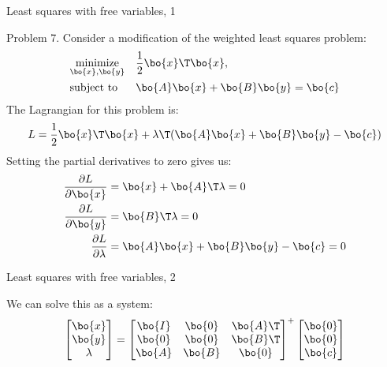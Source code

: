 \documentclass{beamer}
\begin{document}
\begin{frame}{Least squares with free variables, 1}
	\begin{flushleft}
		
		Problem 7. Consider a modification of the weighted least squares problem:
		\begin{equation}
			\begin{aligned}
				& \underset{\bo{x}, \bo{y}}{\text{minimize}}
				& & \frac{1}{2} \bo{x}\T \bo{x}, \\
				& \text{subject to}
				& & \bo{A}\bo{x} + \bo{B}\bo{y}=\bo{c}
			\end{aligned}
		\end{equation}
		The Lagrangian for this problem is:
		\begin{align}
			L = \frac{1}{2} \bo{x}\T \bo{x} + \lambda\T ( \bo{A}\bo{x} + \bo{B}\bo{y}-\bo{c})
		\end{align}
		Setting the partial derivatives to zero gives us:
		\begin{align}
			\frac{\partial L}{\partial \bo{x}} &=
			\bo{x} + \bo{A}\T \lambda = 0 
			\\
			\frac{\partial L}{\partial \bo{y}} &=
			\bo{B}\T \lambda = 0 
			\\
			\frac{\partial L}{\partial \lambda} &= \bo{A}\bo{x} + \bo{B}\bo{y}-\bo{c} = 0
		\end{align}		
		
		
	\end{flushleft}
\end{frame}



\begin{frame}{Least squares with free variables, 2}
	\begin{flushleft}
		
		
		We can solve this as a system:
		\begin{align}
			\begin{bmatrix}
				\bo{x}\\ \bo{y} \\ \lambda
			\end{bmatrix}
			=
			\begin{bmatrix}
				\bo{I} & \bo{0} & \bo{A}\T \\
				\bo{0} & \bo{0} & \bo{B}\T \\
				\bo{A} & \bo{B} & \bo{0}
			\end{bmatrix}^+
			\begin{bmatrix}
				\bo{0}\\ \bo{0} \\ \bo{c} 
			\end{bmatrix}
		\end{align}		
		
		
		
	\end{flushleft}
\end{frame}
\end{document}
